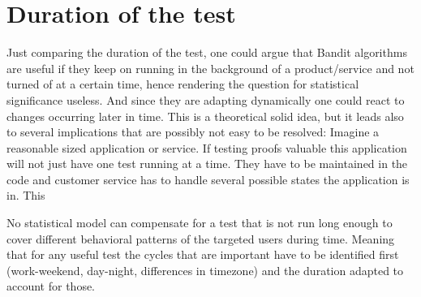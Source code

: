 \documentclass[main.tex]{subfiles}
\begin{document}
\section{Duration of the test}
Just comparing the duration of the test, one could argue that Bandit algorithms are useful if they keep on running in the background of a product/service and not turned of at a certain time, hence rendering the question for statistical significance useless. And since they are adapting dynamically one could react to changes occurring later in time. This is a theoretical solid idea, but it leads also to several implications that are possibly not easy to be resolved: Imagine a reasonable sized application or service. If testing proofs valuable this application will not just have one test running at a time. They have to be maintained in the code and customer service has to handle several possible states the application is in. This 

No statistical model can compensate for a test that is not run long enough to cover different behavioral patterns of the targeted users during time. Meaning that for any useful test the cycles that are important have to be identified first (work-weekend, day-night, differences in timezone) and the duration adapted to account for those.


\end{document}
